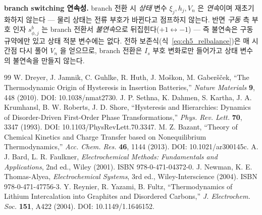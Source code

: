 \documentclass[11pt,a4paper]{article}
\begin{document}
\textbf{branch switching 연속성.} branch 전환 시 \emph{상태} 변수 $\xi_j,h_j,V_n$ 은 \emph{연속}이며 재초기화하지
않는다 — 물리 상태는 전류 부호가 바뀐다고 점프하지 않는다. 반면 \emph{구동} 측 부호 인자 $s_{\phi,j}^b$ 는 branch
전환서 \emph{불연속}으로 뒤집힌다($+1\leftrightarrow-1$) — 즉 불연속은 구동 규약에만 있고 상태 적분 변수에는 없다.
전하 보존식(식~\eqref{eq:ch5_relbalance})은 매 시간점 다시 풀어 $V_n$ 을 얻으므로, branch 전환은 $I_s$ 부호
변화로만 들어가고 상태 변수의 불연속을 만들지 않는다.

\begin{thebibliography}{99}
 W. Dreyer, J. Jamnik, C. Guhlke, R. Huth, J. Mo\v{s}kon, M. Gaber\v{s}\v{c}ek, ``The Thermodynamic Origin of Hysteresis in Insertion Batteries,'' \emph{Nature Materials} \textbf{9}, 448 (2010). DOI: 10.1038/nmat2730.
 J. P. Sethna, K. Dahmen, S. Kartha, J. A. Krumhansl, B. W. Roberts, J. D. Shore, ``Hysteresis and Hierarchies: Dynamics of Disorder-Driven First-Order Phase Transformations,'' \emph{Phys. Rev. Lett.} \textbf{70}, 3347 (1993). DOI: 10.1103/PhysRevLett.70.3347.
 M. Z. Bazant, ``Theory of Chemical Kinetics and Charge Transfer based on Nonequilibrium Thermodynamics,'' \emph{Acc. Chem. Res.} \textbf{46}, 1144 (2013). DOI: 10.1021/ar300145c.
 A. J. Bard, L. R. Faulkner, \emph{Electrochemical Methods: Fundamentals and Applications}, 2nd ed., Wiley (2001). ISBN 978-0-471-04372-0.
 J. Newman, K. E. Thomas-Alyea, \emph{Electrochemical Systems}, 3rd ed., Wiley-Interscience (2004). ISBN 978-0-471-47756-3.
 Y. Reynier, R. Yazami, B. Fultz, ``Thermodynamics of Lithium Intercalation into Graphites and Disordered Carbons,'' \emph{J. Electrochem. Soc.} \textbf{151}, A422 (2004). DOI: 10.1149/1.1646152.
\end{thebibliography}
\end{document}
